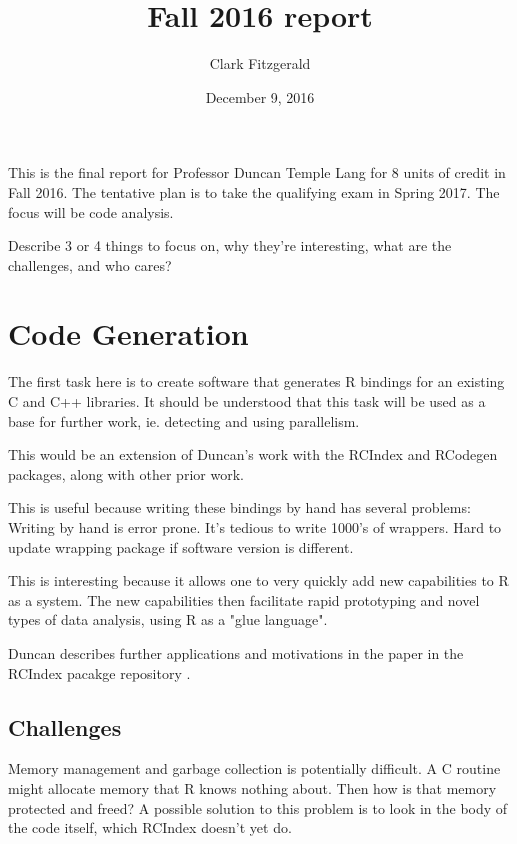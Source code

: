 \documentclass[12pt]{article}
\begin{document}
\title{Fall 2016 report}
\date{December 9, 2016}
\author{Clark Fitzgerald}
\maketitle

This is the final report for Professor Duncan Temple Lang for 8 units of
credit in Fall 2016.  The tentative plan is to take the qualifying exam in
Spring 2017. The focus will be code analysis.

\begin{emph}
Describe 3 or 4 things to focus on, why they're interesting, what are the
challenges, and who cares?
\end{emph}


\section{Code Generation}

The first task here is to create software that generates R bindings for an
existing C and C++ libraries. 
It should be understood that this task will be used as a base for
further work, ie. detecting and using parallelism.

This would be an extension of Duncan's work with the RCIndex \cite{R-RCIndex} and
RCodegen \cite{R-RCodegen} packages, along with other prior work.

This is useful because writing these bindings by hand
has several problems: 
Writing by hand is error prone.
It's tedious to write 1000's of wrappers.
Hard to update wrapping package if software version is different.

This is interesting because it allows one to very quickly add new
capabilities to R as a system. The new capabilities then facilitate rapid
prototyping and novel types of data analysis, using R as a "glue language".

Duncan describes further applications and motivations in the paper in
the RCIndex pacakge repository \cite{R-RCIndex}.

\subsection{Challenges}

Memory management and garbage collection is potentially difficult. A C routine might allocate
memory that R knows nothing about. Then how is that memory protected and freed? A
possible solution to this problem is to look in the body of the code
itself, which RCIndex doesn't yet do.
\end{document}
